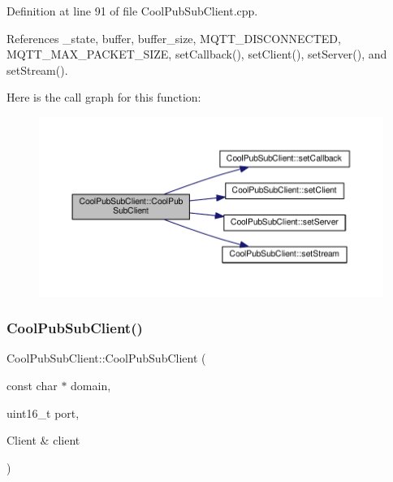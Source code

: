 Definition at line 91 of file Cool\+Pub\+Sub\+Client.\+cpp.



References \+\_\+state, buffer, buffer\+\_\+size, M\+Q\+T\+T\+\_\+\+D\+I\+S\+C\+O\+N\+N\+E\+C\+T\+ED, M\+Q\+T\+T\+\_\+\+M\+A\+X\+\_\+\+P\+A\+C\+K\+E\+T\+\_\+\+S\+I\+ZE, set\+Callback(), set\+Client(), set\+Server(), and set\+Stream().

Here is the call graph for this function\+:\nopagebreak
\begin{figure}[H]
\begin{center}
\leavevmode
\includegraphics[width=350pt]{d8/d4b/class_cool_pub_sub_client_a08309a2cf058099fa5c96c198f777647_cgraph}
\end{center}
\end{figure}
\mbox{\label{class_cool_pub_sub_client_a469eefe7429f0cbb6d7d443b52488411}} 
\subsubsection{\texorpdfstring{Cool\+Pub\+Sub\+Client()}{CoolPubSubClient()}\hspace{0.1cm}{\footnotesize\ttfamily [11/14]}}
{\footnotesize\ttfamily Cool\+Pub\+Sub\+Client\+::\+Cool\+Pub\+Sub\+Client (\begin{DoxyParamCaption}\item[{const char $\ast$}]{domain,  }\item[{uint16\+\_\+t}]{port,  }\item[{Client \&}]{client }\end{DoxyParamCaption})}



